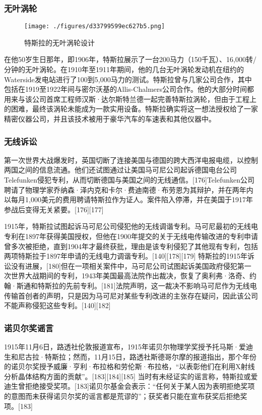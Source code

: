 \subsubsection{无叶涡轮}
\begin{figure}[ht]
\centering
\texttt{[image: ./figures/d33799599ec627b5.png]}
\caption{特斯拉的无叶涡轮设计} \label{fig_Tesla_14}
\end{figure}
在他50岁生日那年，即1906年，特斯拉展示了一台200马力（150千瓦）、16,000转/分钟的无叶涡轮。在1910年至1911年期间，他的几台无叶涡轮发动机在纽约的Waterside发电站进行了100到5,000马力的测试。特斯拉曾与几家公司合作，其中包括在1919至1922年间与密尔沃基的Allis-Chalmers公司合作。他的大部分时间都用来与该公司首席工程师汉斯·达尔斯特兰德一起完善特斯拉涡轮，但由于工程上的困难，最终该涡轮未能成为一款实用设备。特斯拉确实将这一想法授权给了一家精密仪器公司，并且该技术被用于豪华汽车的车速表和其他仪器中。
\subsubsection{无线诉讼}  
第一次世界大战爆发时，英国切断了连接美国与德国的跨大西洋电报电缆，以控制两国之间的信息流通。他们还试图通过让美国马可尼公司起诉德国电台公司Telefunken侵犯专利，从而切断德国与美国之间的无线通信。[176]Telefunken公司聘请了物理学家乔纳森·泽内克和卡尔·费迪南德·布劳恩为其辩护，并在两年内以每月1,000美元的费用聘请特斯拉作为证人。案件陷入停滞，并在美国于1917年参战后变得无关紧要。[176][177]

1915年，特斯拉试图起诉马可尼公司侵犯他的无线调谐专利。马可尼最初的无线电专利在1897年获得美国授权，但他在1900年提交的关于无线电传输改进的专利申请曾多次被拒绝，直到1904年才最终获批，理由是该专利侵犯了其他现有专利，包括两项特斯拉于1897年申请的无线电力调谐专利。[140][178][179] 特斯拉的1915年诉讼没有进展，[180]但在一项相关案件中，马可尼公司试图起诉美国政府侵犯第一次世界大战期间的专利，1943年美国最高法院作出裁决，恢复了奥利弗·洛奇、约翰·斯通和特斯拉的先前专利。[181]法院声明，这一裁决不影响马可尼作为无线电传输首创者的声明，只是因为马可尼对某些专利改进的主张存在疑问，因此该公司不能声称侵犯这些专利。[140][182]
\subsubsection{诺贝尔奖谣言}  
1915年11月6日，路透社伦敦报道宣布，1915年诺贝尔物理学奖授予托马斯·爱迪生和尼古拉·特斯拉；然而，11月15日，路透社斯德哥尔摩的报道指出，那个年份的诺贝尔奖授予威廉·亨利·布拉格和劳伦斯·布拉格，“以表彰他们在利用X射线分析晶体结构方面的贡献”。[183][184][185] 当时有未经证实的谣言称，特斯拉或爱迪生曾拒绝接受奖项。[183]诺贝尔基金会表示：“任何关于某人因为表明拒绝奖项的意图而未获得诺贝尔奖的谣言都是荒谬的”；获奖者只能在宣布获奖后拒绝奖项。[183]

